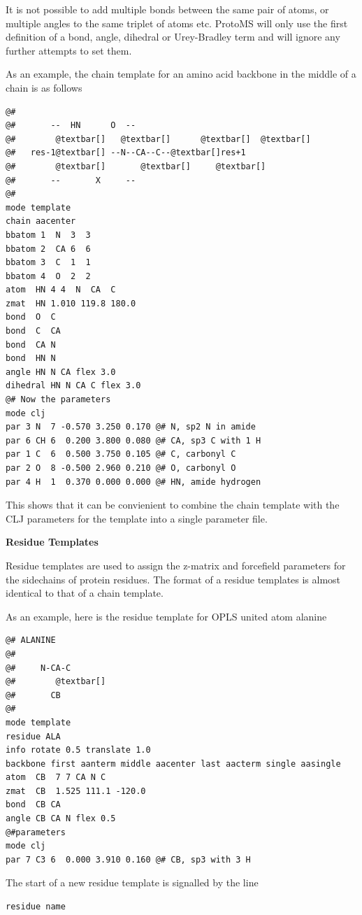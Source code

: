 \documentclass[letterpaper,10pt,english]{manual}
\begin{document}
It is not possible to add multiple bonds between the same pair of atoms, or multiple angles to the same triplet of atoms etc. ProtoMS will only use the first definition of a bond, angle, dihedral or Urey-Bradley term and will ignore any further attempts to set them.

As an example, the chain template for an amino acid backbone in the middle of a chain is as follows

\begin{Verbatim}[commandchars=@\[\]]
@#
@#       --  HN      O  --
@#        @textbar[]   @textbar[]      @textbar[]  @textbar[]
@#   res-1@textbar[] --N--CA--C--@textbar[]res+1
@#        @textbar[]       @textbar[]     @textbar[]
@#       --       X     --
@#
mode template
chain aacenter
bbatom 1  N  3  3
bbatom 2  CA 6  6
bbatom 3  C  1  1
bbatom 4  O  2  2
atom  HN 4 4  N  CA  C
zmat  HN 1.010 119.8 180.0
bond  O  C
bond  C  CA
bond  CA N
bond  HN N
angle HN N CA flex 3.0
dihedral HN N CA C flex 3.0
@# Now the parameters
mode clj
par 3 N  7 -0.570 3.250 0.170 @# N, sp2 N in amide
par 6 CH 6  0.200 3.800 0.080 @# CA, sp3 C with 1 H
par 1 C  6  0.500 3.750 0.105 @# C, carbonyl C
par 2 O  8 -0.500 2.960 0.210 @# O, carbonyl O
par 4 H  1  0.370 0.000 0.000 @# HN, amide hydrogen
\end{Verbatim}

This shows that it can be convienient to combine the chain template with the CLJ parameters for the template into a single parameter file.

\textbf{Residue Templates}

Residue templates are used to assign the z-matrix and forcefield parameters for the sidechains of protein residues. The format of a residue templates is almost identical to that of a chain template.

As an example, here is the residue template for OPLS united atom alanine

\begin{Verbatim}[commandchars=@\[\]]
@# ALANINE
@#
@#     N-CA-C
@#        @textbar[]
@#       CB
@#
mode template
residue ALA
info rotate 0.5 translate 1.0
backbone first aanterm middle aacenter last aacterm single aasingle
atom  CB  7 7 CA N C
zmat  CB  1.525 111.1 -120.0
bond  CB CA
angle CB CA N flex 0.5
@#parameters
mode clj
par 7 C3 6  0.000 3.910 0.160 @# CB, sp3 with 3 H
\end{Verbatim}

The start of a new residue template is signalled by the line

\begin{Verbatim}[commandchars=@\[\]]
residue name
\end{Verbatim}
\end{document}
